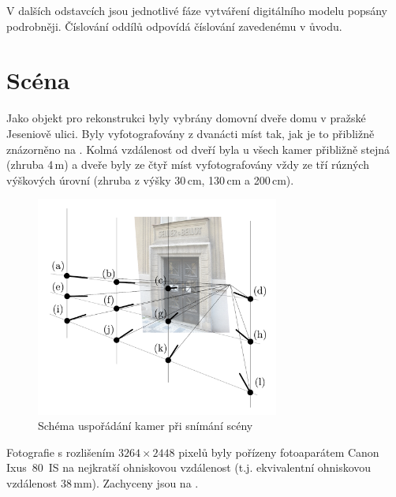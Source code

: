 \documentclass[11pt,oneside,a4paper,pdftex]{article}   %
\begin{document}
	V dalších odstavcích jsou jednotlivé fáze vytváření digitálního modelu popsány podrobněji. Číslování
	oddílů odpovídá číslování zavedenému v ůvodu.


\section{Scéna}

	Jako objekt pro rekonstrukci byly vybrány domovní dveře domu v pražské Jeseniově ulici. Byly
	vyfotografovány z dvanácti míst tak, jak je to přibližně znázorněno na .
	Kolmá vzdálenost od dveří byla u všech kamer přibližně stejná (zhruba 4\,m) a dveře byly ze čtyř
	míst vyfotografovány vždy ze tří rúzných výškových úrovní (zhruba z výšky 30\,cm, 130\,cm a
	200\,cm).
		\begin{figure}[htb]
			\centering
			\includegraphics[width=8cm]{pictures/usporadani_kamer.pdf}
			\caption{Schéma uspořádání kamer při snímání scény}
			\label{figUsporadaniKamer}
		\end{figure}
	Fotografie s rozlišením $3264\times2448$ pixelů byly pořízeny fotoaparátem Canon Ixus~80~IS na
	nejkratší ohniskovou vzdálenost (t.j. ekvivalentní ohniskovou vzdálenost 38\,mm). Zachyceny
	jsou na .
\end{document}
